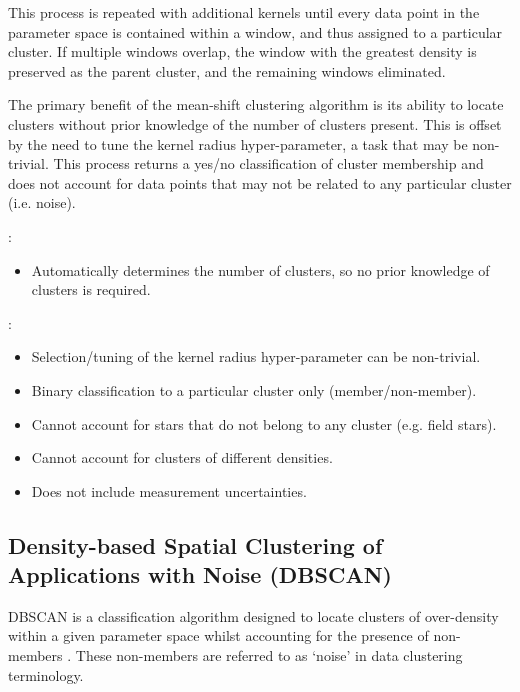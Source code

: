 This process is repeated with additional kernels until every data point in the parameter space is contained within a window, and thus assigned to a particular cluster. If multiple windows overlap, the window with the greatest density is preserved as the parent cluster, and the remaining windows eliminated.

The primary benefit of the mean-shift clustering algorithm is its ability to locate clusters without prior knowledge of the number of clusters present. This is offset by the need to tune the kernel radius hyper-parameter, a task that may be non-trivial. This process returns a yes/no classification of cluster membership and does not account for data points that may not be related to any particular cluster (i.e. noise).

\vspace{10pt}


: 
\begin{itemize}
    \item Automatically determines the number of clusters, so no prior knowledge of clusters is required.
\end{itemize} 

: 
\begin{itemize}
    \item Selection/tuning of the kernel radius hyper-parameter can be non-trivial.
    \item Binary classification to a particular cluster only (member/non-member).
    \item Cannot account for stars that do not belong to any cluster (e.g. field stars).
    \item Cannot account for clusters of different densities.
    \item Does not include measurement uncertainties.

\end{itemize}

\subsection{Density-based Spatial Clustering of Applications with Noise (DBSCAN)}

DBSCAN is a classification algorithm designed to locate clusters of over-density within a given parameter space whilst accounting for the presence of non-members \citep{ester_density-based_1996}. These non-members are referred to as `noise' in data clustering terminology.

